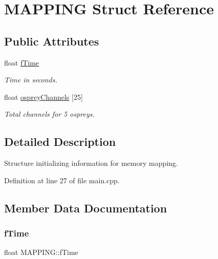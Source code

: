 \hypertarget{struct_m_a_p_p_i_n_g}{}\section{M\+A\+P\+P\+I\+NG Struct Reference}
\label{struct_m_a_p_p_i_n_g}
\subsection*{Public Attributes}
\begin{DoxyCompactItemize}
\item 
\mbox{\label{struct_m_a_p_p_i_n_g_a605d0869c15d3ea6ef8db4675183e0e7}} 
float \hyperlink{struct_m_a_p_p_i_n_g_a605d0869c15d3ea6ef8db4675183e0e7}{f\+Time}
\begin{DoxyCompactList}\small\item\em Time in seconds. \end{DoxyCompactList}\item 
\mbox{\label{struct_m_a_p_p_i_n_g_a61e51da6902d216a44246400c331c988}} 
float \hyperlink{struct_m_a_p_p_i_n_g_a61e51da6902d216a44246400c331c988}{osprey\+Channels} \mbox{[}25\mbox{]}
\begin{DoxyCompactList}\small\item\em Total channels for 5 ospreys. \end{DoxyCompactList}\end{DoxyCompactItemize}


\subsection{Detailed Description}
Structure initializing information for memory mapping. 

Definition at line 27 of file main.\+cpp.



\subsection{Member Data Documentation}
\mbox{\label{struct_m_a_p_p_i_n_g_a605d0869c15d3ea6ef8db4675183e0e7}} 
\subsubsection{\texorpdfstring{f\+Time}{fTime}}
{\footnotesize\ttfamily float M\+A\+P\+P\+I\+N\+G\+::f\+Time}



